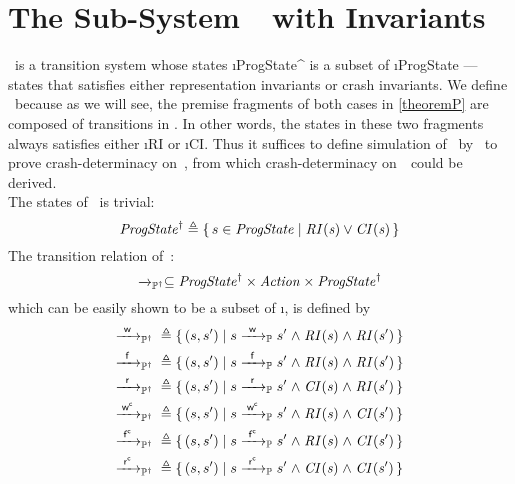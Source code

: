 
\section{The Sub-System~\ProgInv\ with Invariants}
\label{sec:ProgInv}
\ProgInv\ is a transition system whose states \i{ProgState^\dagger} is a subset of \i{ProgState} \---- states that satisfies either representation invariants or crash invariants. We define \ProgInv\ because as we will see, the premise fragments of both cases in \cref{theoremP} are composed of transitions in \ProgInv. In other words, the states in these two fragments always satisfies either \i{RI} or \i{CI}. Thus it suffices to define simulation of \ProgInv\ by \Spec\ to prove crash-determinacy on~\ProgInv, from which crash-determinacy on~\Prog\ could be derived. \\
The states of \ProgInv\ is trivial:
$$\mathit{ProgState^{\dagger}} {}\triangleq{}{} \{\, s \in \mathit{ProgState} \mid \mathit{RI(s) \lor CI(s)} \,\}$$
The transition relation of~\ProgInv:
$$\xrightarrow{}_{\mathbb P^\dagger} \subseteq \mathit{ProgState^\dagger} \times \mathit{Action} \times \mathit{ProgState^\dagger}$$
which can be easily shown to be a subset of \i{\ttP{}}, is defined by
\begin{alignat*}{3}
	\ttPI{\awa{w}\actw} \defeq{}& \{\, (s, s') \mid s \ttP{\awa{w}\actw} s' \conj \i{RI(s)} \conj \i{RI(s')} \,\} \\
	\ttPI{\awa{w}\actf} \defeq{}& \{\, (s, s') \mid s \ttP{\awa{w}\actf} s' \conj \i{RI(s)} \conj \i{RI(s')} \,\} \\
	\ttPI{\awa{w}\actr} \defeq{}& \{\, (s, s') \mid s \ttP{\awa{w}\actr} s' \conj \i{CI(s)} \conj \i{RI(s')} \,\} \\
	\ttPI{\awa{w}\actwc} \defeq{}& \{\, (s, s') \mid s \ttP{\awa{w}\actwc} s' \conj \i{RI(s)} \conj \i{CI(s')} \,\} \\
	\ttPI{\awa{w}\actfc} \defeq{}& \{\, (s, s') \mid s \ttP{\awa{w}\actfc} s' \conj \i{RI(s)} \conj \i{CI(s')} \,\} \\
	\ttPI{\awa{w}\actrc} \defeq{}& \{\, (s, s') \mid s \ttP{\awa{w}\actrc} s' \conj \i{CI(s)} \conj \i{CI(s')} \,\} 
\end{alignat*}

